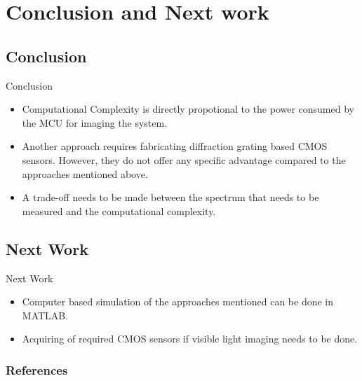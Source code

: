 \documentclass{beamer}
\begin{document}
\section[]{Conclusion and Next work}
\subsection{Conclusion}
\begin{frame}{Conclusion}
\begin{itemize}
\item Computational Complexity is directly propotional to the power consumed by the MCU for imaging the system.
\item Another approach requires fabricating diffraction grating based CMOS sensors. However, they do not offer any specific advantage compared to the approaches mentioned above.
\item A trade-off needs to be made between the spectrum that needs to be measured and the computational complexity.
\end{itemize}
\begin{table}[ht]
\caption{Comparison of Different Approaches}
\label{tbl:
cmp}
\end{table}
\end{frame}
\subsection{Next Work}
\begin{frame}{Next Work}
\begin{itemize}
\item Computer based simulation of the approaches mentioned can be done in MATLAB.

\item Acquiring of required CMOS sensors if visible light imaging needs to be done.

\end{itemize}
\end{frame}
\begin{frame}[allowframebreaks]
\frametitle{References}
    {\footnotesize
    
    
    }
\end{frame}
\end{document}
